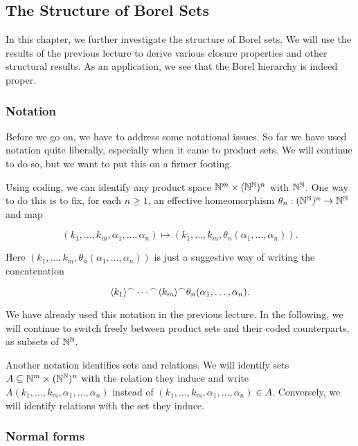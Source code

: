 \subsection{The Structure of Borel Sets}

In this chapter, we further investigate the structure of Borel sets. We will use the results of the previous lecture to derive various closure properties and other structural results. As an application, we see that the Borel hierarchy is indeed proper.

\subsubsection{Notation}

Before we go on, we have to address some notational issues. So far we have used notation quite liberally, especially when it came to product sets. We will continue to do so, but we want to put this on a firmer footing.

Using coding, we can identify any product space $\mathbb{N}^m \times (\mathbb{N}^{\mathbb{N}})^n$ with $\mathbb{N}^{\mathbb{N}}$. One way to do this is to fix, for each $n \geq 1$, an effective homeomorphism $\theta_n: (\mathbb{N}^{\mathbb{N}})^n \to \mathbb{N}^{\mathbb{N}}$ and map

\begin{equation}
(k_1, \dots, k_m, \alpha_1, \dots, \alpha_n) \mapsto (k_1,\dots, k_m, \theta_n(\alpha_1, \dots, \alpha_n)).
\end{equation}

Here $(k_1,\dots, k_m, \theta_n(\alpha_1, \dots, \alpha_n))$ is just a suggestive way of writing the concatenation

\begin{equation}
\langle k_1 \rangle \mbox{}^\frown \cdots \mbox{}^\frown \langle k_m \rangle \mbox{}^\frown \theta_n(\alpha_1, \dots, \alpha_n).
\end{equation}

We have already used this notation in the previous lecture. In the following, we will continue to switch freely between product sets and their coded counterparts, as subsets of $\mathbb{N}^{\mathbb{N}}$.

Another notation identifies sets and relations. We will identify sets $A \subseteq \mathbb{N}^m \times (\mathbb{N}^{\mathbb{N}})^n$ with the relation they induce and write $A(k_1, \dots, k_m, \alpha_1, \dots, \alpha_n)$ instead of $(k_1, \dots, k_m, \alpha_1, \dots, \alpha_n) \in A$. Conversely, we will identify relations with the set they induce.

\subsubsection{Normal forms}

